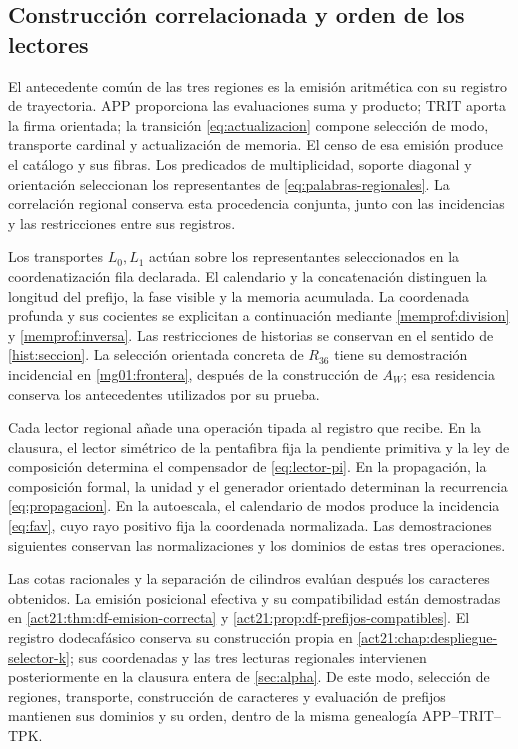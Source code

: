\subsection{Construcción correlacionada y orden de los lectores}
\label{gen:orden-constructor-correlacionado}

El antecedente común de las tres regiones es la emisión aritmética con
su registro de trayectoria. APP proporciona las evaluaciones suma y
producto; TRIT aporta la firma orientada; la transición
\eqref{eq:actualizacion} compone selección de modo, transporte cardinal y
actualización de memoria. El censo de esa emisión produce el catálogo y
sus fibras. Los predicados de multiplicidad, soporte diagonal y orientación
seleccionan los representantes de \eqref{eq:palabras-regionales}.
La correlación regional conserva esta procedencia conjunta, junto con las
incidencias y las restricciones entre sus registros.

Los transportes \(L_0,L_1\) actúan sobre los representantes seleccionados
en la coordenatización fila declarada. El calendario y la concatenación distinguen
la longitud del prefijo, la fase visible y la memoria acumulada. La
coordenada profunda y sus cocientes se explicitan a continuación mediante
\eqref{memprof:division} y \eqref{memprof:inversa}. Las restricciones de
historias se conservan en el sentido de \ref{hist:seccion}.
La selección orientada concreta de \(R_{36}\) tiene su demostración
incidencial en \ref{mg01:frontera}, después de la construcción de \(A_W\);
esa residencia conserva los antecedentes utilizados por su prueba.

Cada lector regional añade una operación tipada al registro que recibe.
En la clausura, el lector simétrico de la pentafibra fija la pendiente
primitiva y la ley de composición determina el compensador de
\eqref{eq:lector-pi}. En la propagación, la composición formal, la unidad
y el generador orientado determinan la recurrencia
\eqref{eq:propagacion}. En la autoescala, el calendario de modos produce
la incidencia \eqref{eq:fav}, cuyo rayo positivo fija la coordenada
normalizada. Las demostraciones siguientes conservan las normalizaciones
y los dominios de estas tres operaciones.

Las cotas racionales y la separación de cilindros evalúan después los
caracteres obtenidos. La emisión posicional efectiva y su compatibilidad
están demostradas en \ref{act21:thm:df-emision-correcta} y
\ref{act21:prop:df-prefijos-compatibles}. El registro dodecafásico conserva
su construcción propia en \ref{act21:chap:despliegue-selector-k};
sus coordenadas y las tres lecturas regionales intervienen posteriormente
en la clausura entera de \ref{sec:alpha}. De este modo, selección de
regiones, transporte, construcción de caracteres y evaluación de prefijos
mantienen sus dominios y su orden, dentro de la misma genealogía
APP--TRIT--TPK.
